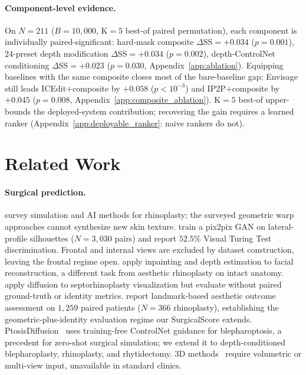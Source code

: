 \documentclass{article}
\newcommand{\method}{Envisage}
\begin{document}
\paragraph{Component-level evidence.} On $N{=}211$ ($B{=}10{,}000$, K$=5$
best-of paired permutation), each component is individually
paired-significant: hard-mask composite $\Delta$SS$=+0.034$ ($p{=}0.001$),
$24$-preset depth modification $\Delta$SS$=+0.034$ ($p{=}0.002$),
depth-ControlNet conditioning $\Delta$SS$=+0.023$ ($p{=}0.030$,
Appendix~\ref{app:ablation}). Equipping baselines with the same composite
closes most of the bare-baseline gap; \method{} still leads
ICEdit$+$composite by $+0.058$ ($p<10^{-3}$) and IP2P$+$composite by
$+0.045$ ($p{=}0.008$, Appendix~\ref{app:composite_ablation}). K$=5$ best-of
upper-bounds the deployed-system contribution; recovering the gain requires
a learned ranker (Appendix~\ref{app:deployable_ranker}: naive rankers do
not).

\section{Related Work}
\label{sec:related}

\paragraph{Surgical prediction.}
\citet{eldaly2022rhinoplastyAIreview} survey simulation and AI methods
for rhinoplasty; the surveyed geometric warp approaches cannot synthesize
new skin texture.
\citet{jung2024rhinoplastygan} train a pix2pix GAN on lateral-profile
silhouettes ($N{=}3{,}030$ pairs) and report $52.5\%$ Visual Turing Test
discrimination. Frontal and internal views are excluded by dataset
construction, leaving the frontal regime open.
\citet{bini2025facial} apply inpainting and depth estimation to facial
reconstruction, a different task from aesthetic rhinoplasty on intact
anatomy. \citet{loorduque2024septorhinoplasty} apply diffusion to
septorhinoplasty visualization but evaluate without paired ground-truth or
identity metrics. \citet{varghaei2025aesthetic} report landmark-based
aesthetic outcome assessment on $1{,}259$ paired patients ($N{=}366$
rhinoplasty), establishing the geometric-plus-identity evaluation regime
our SurgicalScore extends.
PtosisDiffusion~\citep{ptosisdiffusion2024} uses training-free ControlNet
guidance for blepharoptosis, a precedent for zero-shot surgical
simulation; we extend it to depth-conditioned blepharoplasty, rhinoplasty,
and rhytidectomy. 3D methods~\citep{ma2021orthognathic} require volumetric or
multi-view input, unavailable in standard clinics.
\end{document}

